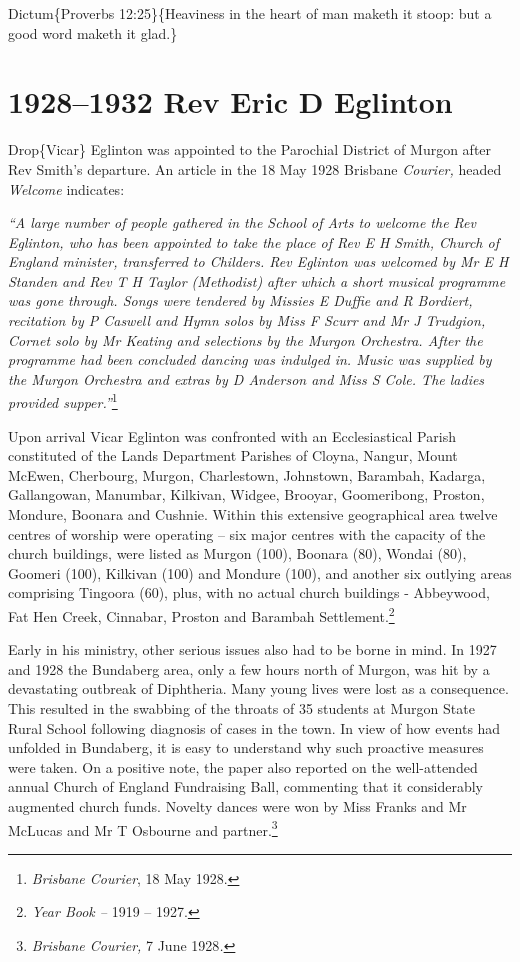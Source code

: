 Dictum\{Proverbs 12:25\}\{Heaviness in the heart of man maketh it stoop: but a good word maketh it glad.\}

\hypertarget{rev-eric-d-eglinton}{%
\chapter{1928--1932 Rev Eric D Eglinton}\label{rev-eric-d-eglinton}}

Drop\{Vicar\} Eglinton was appointed to the Parochial District of Murgon after Rev Smith's departure. An article in the 18 May 1928 Brisbane \emph{Courier,} headed \emph{Welcome} indicates:

\emph{``A large number of people gathered in the School of Arts to welcome the Rev Eglinton, who has been appointed to take the place of Rev E H Smith, Church of England minister, transferred to Childers. Rev Eglinton was welcomed by Mr E H Standen and Rev T H Taylor (Methodist) after which a short musical programme was gone through. Songs were tendered by Missies E Duffie and R Bordiert, recitation by P Caswell and Hymn solos by Miss F Scurr and Mr J Trudgion, Cornet solo by Mr Keating and selections by the Murgon Orchestra. After the programme had been concluded dancing was indulged in. Music was supplied by the Murgon Orchestra and extras by D Anderson and Miss S Cole. The ladies provided supper.''}\footnote{\emph{Brisbane Courier}, 18 May 1928.}

Upon arrival Vicar Eglinton was confronted with an Ecclesiastical Parish constituted of the Lands Department Parishes of Cloyna, Nangur, Mount McEwen, Cherbourg, Murgon, Charlestown, Johnstown, Barambah, Kadarga, Gallangowan, Manumbar, Kilkivan, Widgee, Brooyar, Goomeribong, Proston, Mondure, Boonara and Cushnie. Within this extensive geographical area twelve centres of worship were operating -- six major centres with the capacity of the church buildings, were listed as Murgon (100), Boonara (80), Wondai (80), Goomeri (100), Kilkivan (100) and Mondure (100), and another six outlying areas comprising Tingoora (60), plus, with no actual church buildings - Abbeywood, Fat Hen Creek, Cinnabar, Proston and Barambah Settlement.\footnote{\emph{Year Book --} 1919 -- 1927.}

Early in his ministry, other serious issues also had to be borne in mind. In 1927 and 1928 the Bundaberg area, only a few hours north of Murgon, was hit by a devastating outbreak of Diphtheria. Many young lives were lost as a consequence. This resulted in the swabbing of the throats of 35 students at Murgon State Rural School following diagnosis of cases in the town. In view of how events had unfolded in Bundaberg, it is easy to understand why such proactive measures were taken. On a positive note, the paper also reported on the well-attended annual Church of England Fundraising Ball, commenting that it considerably augmented church funds. Novelty dances were won by Miss Franks and Mr McLucas and Mr T Osbourne and partner.\footnote{\emph{Brisbane Courier,} 7 June 1928\emph{.}}

